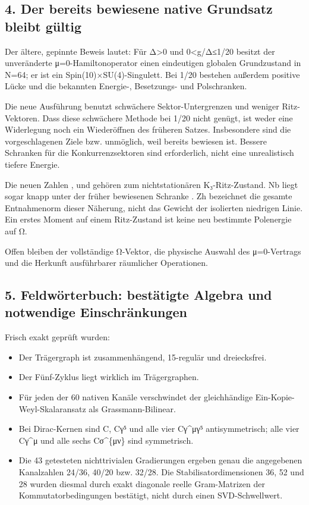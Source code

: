 \subsection{4. Der bereits bewiesene native Grundsatz bleibt
gültig}\label{der-bereits-bewiesene-native-grundsatz-bleibt-guxfcltig}

Der ältere, gepinnte Beweis lautet: Für Δ\textgreater0 und
0\textless\textbar g\textbar/Δ≤1/20 besitzt der unveränderte
μ=0-Hamiltonoperator einen eindeutigen globalen Grundzustand in N=64; er
ist ein Spin(10)×SU(4)-Singulett. Bei 1/20 bestehen außerdem positive
Lücke und die bekannten Energie-, Besetzungs- und Polschranken.

Die neue Ausführung benutzt schwächere Sektor-Untergrenzen und weniger
Ritz-Vektoren. Dass diese schwächere Methode bei 1/20 nicht genügt, ist
weder eine Widerlegung noch ein Wiederöffnen des früheren Satzes.
Insbesondere sind die vorgeschlagenen Ziele  bzw.
 unmöglich, weil bereits 
bewiesen ist. Bessere Schranken für die Konkurrenzsektoren sind
erforderlich, nicht eine unrealistisch tiefere Energie.

Die neuen Zahlen ,  und
 gehören zum nichtstationären K₃-Ritz-Zustand.
Nb liegt sogar knapp unter der früher bewiesenen Schranke
. Zh bezeichnet die gesamte Entnahmenorm dieser
Näherung, nicht das Gewicht der isolierten niedrigen Linie. Ein erstes
Moment auf einem Ritz-Zustand ist keine neu bestimmte Polenergie auf Ω.

Offen bleiben der vollständige Ω-Vektor, die physische Auswahl des
μ=0-Vertrags und die Herkunft ausführbarer räumlicher Operationen.

\subsection{5. Feldwörterbuch: bestätigte Algebra und notwendige
Einschränkungen}\label{feldwuxf6rterbuch-bestuxe4tigte-algebra-und-notwendige-einschruxe4nkungen}

Frisch exakt geprüft wurden:

\begin{itemize}
\tightlist
\item
  Der Trägergraph ist zusammenhängend, 15-regulär und dreiecksfrei.
\item
  Der Fünf-Zyklus  liegt wirklich im
  Trägergraphen.
\item
  Für jeden der 60 nativen Kanäle verschwindet der gleichhändige
  Ein-Kopie-Weyl-Skalaransatz  als Grassmann-Bilinear.
\item
  Bei Dirac-Kernen sind C, Cγ⁵ und alle vier Cγ\^{}μγ⁵ antisymmetrisch;
  alle vier Cγ\^{}μ und alle sechs Cσ\^{}\{μν\} sind symmetrisch.
\item
  Die 43 getesteten nichttrivialen Gradierungen ergeben genau die
  angegebenen Kanalzahlen 24/36, 40/20 bzw. 32/28. Die
  Stabilisatordimensionen 36, 52 und 28 wurden diesmal durch exakt
  diagonale reelle Gram-Matrizen der Kommutatorbedingungen bestätigt,
  nicht durch einen SVD-Schwellwert.
\end{itemize}

